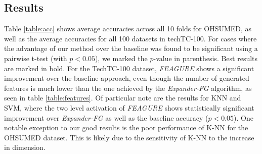 \documentclass[twoside,11pt]{article}
\theoremstyle{definition}
\begin{document}


\subsection{Results}

Table \ref{table:acc} shows average accuracies across all 10 folds for OHSUMED, as well as the average accuracies for all 100 datasets in techTC-100. For cases where the advantage of our method over the baseline was found to be significant using a pairwise t-test (with $p<0.05$), we marked the $p$-value in parenthesis. Best results are marked in bold.
For the TechTC-100 dataset, \emph{FEAGURE} shows a significant improvement over the baseline approach, even though the number of generated features is much lower than the one achieved by the \emph{Expander-FG} algorithm, as seen in table \ref{table:features}.
Of particular note are the results for KNN and SVM, where the two level activation of \emph{FEAGURE} shows statistically significant improvement over \emph{Expander-FG} as well as the baseline accuracy ($p < 0.05$). 
One notable exception to our good results is the poor performance of K-NN for the OHSUMED dataset. This is likely due to the sensitivity of K-NN to the increase in dimension. 

\end{document}
